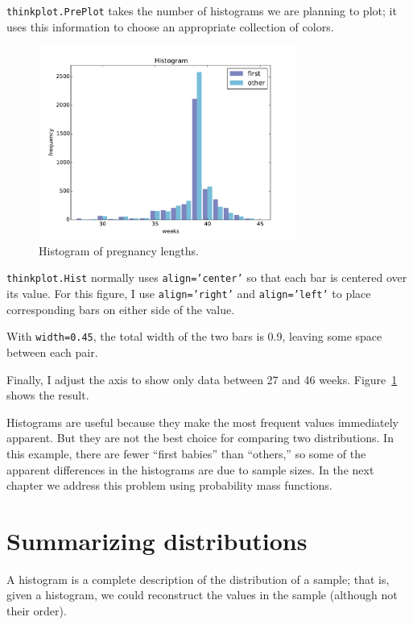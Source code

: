 \documentclass[12pt]{book}
\begin{document}
{\tt thinkplot.PrePlot} takes the number of histograms
we are planning to plot; it uses this information to choose
an appropriate collection of colors.

\begin{figure}
\centerline{\includegraphics[height=2.5in]{figs/first_nsfg_hist.pdf}}
\caption{Histogram of pregnancy lengths.}
\label{first_nsfg_hist}
\end{figure}

{\tt thinkplot.Hist} normally uses {\tt align='center'} so that
each bar is centered over its value.  For this figure, I use
{\tt align='right'} and {\tt align='left'} to place
corresponding bars on either side of the value.

With {\tt width=0.45}, the total width of the two bars is 0.9,
leaving some space between each pair.

Finally, I adjust the axis to show only data between 27 and 46 weeks.
Figure~\ref{first_nsfg_hist} shows the result.

Histograms are useful because they make the most frequent values
immediately apparent.  But they are not the best choice for comparing
two distributions.  In this example, there are fewer ``first babies''
than ``others,'' so some of the apparent differences in the histograms
are due to sample sizes.  In the next chapter we address this problem
using probability mass functions.


\section{Summarizing distributions}
\label{mean}

A histogram is a complete description of the distribution of a sample;
that is, given a histogram, we could reconstruct the values in the
sample (although not their order).
\end{document}
